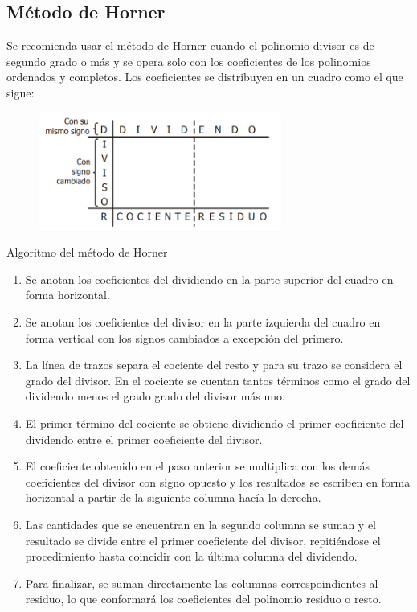 {    \subsection{Método de Horner}
    {
        Se recomienda usar el método de Horner cuando el polinomio divisor es de segundo grado o más y se opera solo con
        los coeficientes de los polinomios ordenados y completos. Los coeficientes se distribuyen en un cuadro como el que sigue:
        \begin{figure}[htb]
            \centering
            \includegraphics[width=8cm]{images/metodo-de-horner}
        \end{figure}

        Algoritmo del método de Horner
        \begin{enumerate}
            \item Se anotan los coeficientes del dividiendo en la parte superior del cuadro en forma horizontal.
            \item Se anotan los coeficientes del divisor en la parte izquierda del cuadro en forma vertical con los signos cambiados a excepción del primero.
            \item La línea de trazos separa el cociente del resto y para su trazo se considera el grado del divisor.
            En el cociente se cuentan tantos términos como el grado del dividendo menos el grado grado del divisor más uno.
            \item El primer término del cociente se obtiene dividiendo el primer coeficiente del dividendo entre el primer coeficiente del divisor.
            \item El coeficiente obtenido en el paso anterior se multiplica con los demás coeficientes del divisor con signo opuesto y los resultados se escriben en forma horizontal a partir de la siguiente columna hacía la derecha.
            \item Las cantidades que se encuentran en la segundo columna se suman y el resultado se divide entre el primer coeficiente del divisor, repitiéndose el procedimiento hasta coincidir con la última columna del dividendo.
            \item Para finalizar, se suman directamente las columnas correspoindientes al residuo, lo que conformará los coeficientes del polinomio residuo o resto.
        \end{enumerate}
    }
    
}
